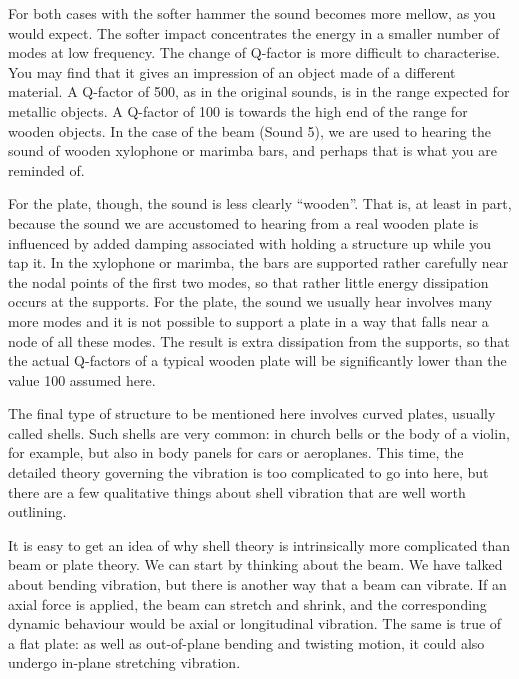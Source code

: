 \audio{}

\audio{}

\audio{}

\audio{}

  For both cases with the softer hammer the sound becomes more mellow, as you 
  would expect. The softer impact concentrates the energy in a smaller number 
  of modes at low frequency. The change of Q-factor is more difficult to 
  characterise. You may find that it gives an impression of an object made of a 
  different material. A Q-factor of 500, as in the original sounds, is in the 
  range expected for metallic objects. A Q-factor of 100 is towards the high 
  end of the range for wooden objects. In the case of the beam (Sound 5), we 
  are used to hearing the sound of wooden xylophone or marimba bars, and 
  perhaps that is what you are reminded of. 

  For the plate, though, the sound is less clearly ``wooden''. That is, at 
  least in part, because the sound we are accustomed to hearing from a real 
  wooden plate is influenced by added damping associated with holding a 
  structure up while you tap it. In the xylophone or marimba, the bars are 
  supported rather carefully near the nodal points of the first two modes, so 
  that rather little energy dissipation occurs at the supports. For the plate, 
  the sound we usually hear involves many more modes and it is not possible to 
  support a plate in a way that falls near a node of all these modes. The 
  result is extra dissipation from the supports, so that the actual Q-factors 
  of a typical wooden plate will be significantly lower than the value 100 
  assumed here. 

  The final type of structure to be mentioned here involves curved plates, 
  usually called shells. Such shells are very common: in church bells or the 
  body of a violin, for example, but also in body panels for cars or 
  aeroplanes. This time, the detailed theory governing the vibration is too 
  complicated to go into here, but there are a few qualitative things about 
  shell vibration that are well worth outlining. 

  It is easy to get an idea of why shell theory is intrinsically more 
  complicated than beam or plate theory. We can start by thinking about the 
  beam. We have talked about bending vibration, but there is another way that a 
  beam can vibrate. If an axial force is applied, the beam can stretch and 
  shrink, and the corresponding dynamic behaviour would be axial or 
  longitudinal vibration. The same is true of a flat plate: as well as 
  out-of-plane bending and twisting motion, it could also undergo in-plane 
  stretching vibration. 

